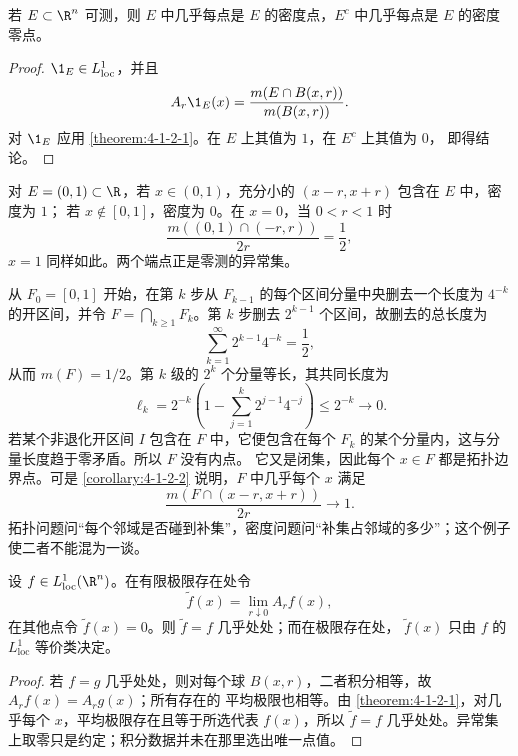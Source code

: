 \begin{corollary}\label{corollary:4-1-2-2}
若 $E\subset\R^n$ 可测，则 $E$ 中几乎每点是 $E$ 的密度点，$E^c$ 中几乎每点是
$E$ 的密度零点。
\end{corollary}

\begin{proof}
$\1_E\in L^1_{\mathrm{loc}}$，并且
\[
 A_r\1_E(x)=\frac{m(E\cap B(x,r))}{m(B(x,r))}.
\]
对 $\1_E$ 应用 \cref{theorem:4-1-2-1}。在 $E$ 上其值为 $1$，在 $E^c$ 上其值为 $0$，
即得结论。
\end{proof}

\begin{example}[区间端点]\label{ex:4-1-2-2}
对 $E=(0,1)\subset\R$，若 $x\in(0,1)$，充分小的 $(x-r,x+r)$ 包含在 $E$ 中，密度为 $1$；
若 $x\notin[0,1]$，密度为 $0$。在 $x=0$，当 $0<r<1$ 时
\[
 \frac{m((0,1)\cap(-r,r))}{2r}=\frac12,
\]
$x=1$ 同样如此。两个端点正是零测的异常集。
\end{example}

\begin{example}[肥 Cantor 集]\label{ex:4-1-2-3}
从 $F_0=[0,1]$ 开始，在第 $k$ 步从 $F_{k-1}$ 的每个区间分量中央删去一个长度为 $4^{-k}$
的开区间，并令 $F=\bigcap_{k\ge1}F_k$。第 $k$ 步删去 $2^{k-1}$ 个区间，故删去的总长度为
\[
 \sum_{k=1}^\infty 2^{k-1}4^{-k}=\frac12,
\]
从而 $m(F)=1/2$。第 $k$ 级的 $2^k$ 个分量等长，其共同长度为
\[
 \ell_k=2^{-k}\left(1-\sum_{j=1}^k2^{j-1}4^{-j}\right)
 \le2^{-k}\longrightarrow0.
\]
若某个非退化开区间
$I$ 包含在 $F$ 中，它便包含在每个 $F_k$ 的某个分量内，这与分量长度趋于零矛盾。所以 $F$ 没有内点。
它又是闭集，因此每个 $x\in F$ 都是拓扑边界点。可是
\cref{corollary:4-1-2-2} 说明，$F$ 中几乎每个 $x$ 满足
\[
 \frac{m(F\cap(x-r,x+r))}{2r}\longrightarrow1.
\]
拓扑问题问“每个邻域是否碰到补集”，密度问题问“补集占邻域的多少”；这个例子使二者不能混为一谈。
\end{example}

\begin{proposition}[精确代表的约定]\label{proposition:4-1-2-4}
设 $f\in L^1_{\mathrm{loc}}(\R^n)$。在有限极限存在处令
\[
 \widetilde f(x)=\lim_{r\downarrow0}A_rf(x),
\]
在其他点令 $\widetilde f(x)=0$。则 $\widetilde f=f$ 几乎处处；而在极限存在处，
$\widetilde f(x)$ 只由 $f$ 的 $L^1_{\mathrm{loc}}$ 等价类决定。
\end{proposition}

\begin{proof}
若 $f=g$ 几乎处处，则对每个球 $B(x,r)$，二者积分相等，故 $A_rf(x)=A_rg(x)$；所有存在的
平均极限也相等。由 \cref{theorem:4-1-2-1}，对几乎每个 $x$，平均极限存在且等于所选代表
$f(x)$，所以 $\widetilde f=f$ 几乎处处。异常集上取零只是约定；积分数据并未在那里选出唯一点值。
\end{proof}

